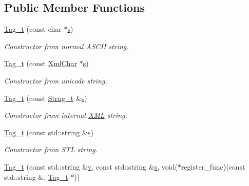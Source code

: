 \subsection*{Public Member Functions}
\begin{DoxyCompactItemize}
\item 
\hyperlink{class_d_d4hep_1_1_x_m_l_1_1_tag__t_aa7b0da20ca009a5fb665c79ea660fbc3}{Tag\+\_\+t} (const char $\ast$\hyperlink{_volumes_8cpp_a17ca6bfc8040d695d3cada22a4763d40}{s})
\begin{DoxyCompactList}\small\item\em Constructor from normal A\+S\+C\+II string. \end{DoxyCompactList}\item 
\hyperlink{class_d_d4hep_1_1_x_m_l_1_1_tag__t_a1a301039b9be52aacf1927975c135131}{Tag\+\_\+t} (const \hyperlink{namespace_d_d4hep_1_1_x_m_l_a09e5d9cc86ed782f6826dfe0778c1815}{Xml\+Char} $\ast$\hyperlink{_volumes_8cpp_a17ca6bfc8040d695d3cada22a4763d40}{s})
\begin{DoxyCompactList}\small\item\em Constructor from unicode string. \end{DoxyCompactList}\item 
\hyperlink{class_d_d4hep_1_1_x_m_l_1_1_tag__t_a9c6f70c4676068b78dd2d4e594d85162}{Tag\+\_\+t} (const \hyperlink{class_d_d4hep_1_1_x_m_l_1_1_strng__t}{Strng\+\_\+t} \&\hyperlink{_volumes_8cpp_a17ca6bfc8040d695d3cada22a4763d40}{s})
\begin{DoxyCompactList}\small\item\em Constructor from internal \hyperlink{namespace_d_d4hep_1_1_x_m_l}{X\+ML} string. \end{DoxyCompactList}\item 
\hyperlink{class_d_d4hep_1_1_x_m_l_1_1_tag__t_a1b57625b6abcc2e563bf55b5e69f5877}{Tag\+\_\+t} (const std\+::string \&\hyperlink{_volumes_8cpp_a17ca6bfc8040d695d3cada22a4763d40}{s})
\begin{DoxyCompactList}\small\item\em Constructor from S\+TL string. \end{DoxyCompactList}\item 
\hyperlink{class_d_d4hep_1_1_x_m_l_1_1_tag__t_a852d3feade27fadfa267798e8e417b80}{Tag\+\_\+t} (const std\+::string \&\hyperlink{_multi_view_8cpp_a8320ee13ac034dbf6d624fe8953dd337}{v}, const std\+::string \&\hyperlink{_volumes_8cpp_a17ca6bfc8040d695d3cada22a4763d40}{s}, void($\ast$register\+\_\+func)(const std\+::string \&, \hyperlink{class_d_d4hep_1_1_x_m_l_1_1_tag__t}{Tag\+\_\+t} $\ast$))

\end{DoxyCompactItemize}
